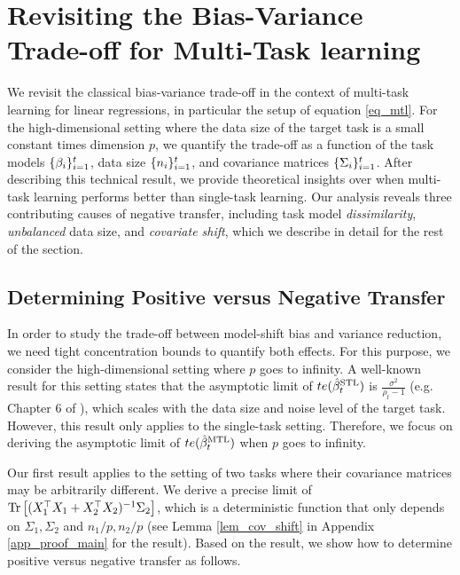 \section{Revisiting the Bias-Variance Trade-off for Multi-Task learning}
\label{sec_insight}

We revisit the classical bias-variance trade-off in the context of multi-task learning for linear regressions, in particular the setup of equation \eqref{eq_mtl}.
For the high-dimensional setting where the data size of the target task is a small constant times dimension $p$, we quantify the trade-off as a function of the task models $\{\beta_i\}_{i=1}^t$, data size $\{n_i\}_{i=1}^t$, and covariance matrices $\{\Sigma_i\}_{i=1}^t$.
After describing this technical result, we provide theoretical insights over when multi-task learning performs better than single-task learning.
Our analysis reveals three contributing causes of negative transfer, including task model \textit{dissimilarity}, \textit{unbalanced} data size, and \textit{covariate shift}, which we describe in detail for the rest of the section.


\subsection{Determining Positive versus Negative Transfer}\label{sec_main}

In order to study the trade-off between model-shift bias and variance reduction, we need tight concentration bounds to quantify both effects.
For this purpose, we consider the high-dimensional setting where $p$ goes to infinity.
A well-known result for this setting states that the asymptotic limit of $te(\hat{\beta}_t^{\text{STL}})$ is $\frac {\sigma^2} {\rho_t - 1}$ (e.g. Chapter 6 of \cite{S07}), which scales with the data size and noise level of the target task.
However, this result only applies to the single-task setting.
Therefore, we focus on deriving the asymptotic limit of $te(\hat{\beta}_t^{\text{MTL}})$ when $p$ goes to infinity.

Our first result applies to the setting of two tasks where their covariance matrices may be arbitrarily different.
We derive a precise limit of $\operatorname{Tr}\left[(X_1^{\top}X_1 + X_2^{\top}X_2)^{-1}\Sigma_2\right]$, which is a deterministic function that only depends on $\Sigma_1, \Sigma_2$ and $n_1/p, n_2/p$ (see Lemma \ref{lem_cov_shift} in Appendix \ref{app_proof_main} for the result).
Based on the result, we show how to determine positive versus negative transfer as follows.

